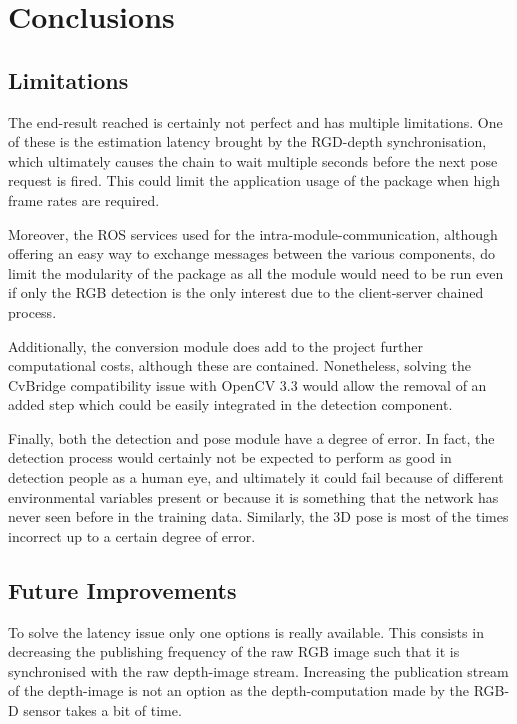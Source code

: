 \chapter{Conclusions}
\label{chapter8}

\section{Limitations}

The end-result reached is certainly not perfect and has multiple limitations. One of these is the estimation latency brought by the RGD-depth synchronisation, which ultimately causes the chain to wait multiple seconds before the next pose request is fired. This could limit the application usage of the package when high frame rates are required.

Moreover, the ROS services used for the intra-module-communication, although offering an easy way to exchange messages between the various components, do limit the modularity of the package as all the module would need to be run even if only the RGB detection is the only interest due to the client-server chained process.

Additionally, the conversion module does add to the project further computational costs, although these are contained. Nonetheless, solving the CvBridge compatibility issue with OpenCV 3.3 would allow the removal of an added step which could be easily integrated in the detection component.

Finally, both the detection and pose module have a degree of error. In fact, the detection process would certainly not be expected to perform as good in detection people as a human eye, and ultimately it could fail because of different environmental variables present or because it is something that the network has never seen before in the training data. Similarly, the 3D pose is most of the times incorrect up to a certain degree of error.

\section{Future Improvements}

To solve the latency issue only one options is really available. This consists in decreasing the publishing frequency of the raw RGB image such that it is synchronised with the raw depth-image stream. Increasing the publication stream of the depth-image is not an option as the depth-computation made by the RGB-D sensor takes a bit of time.

